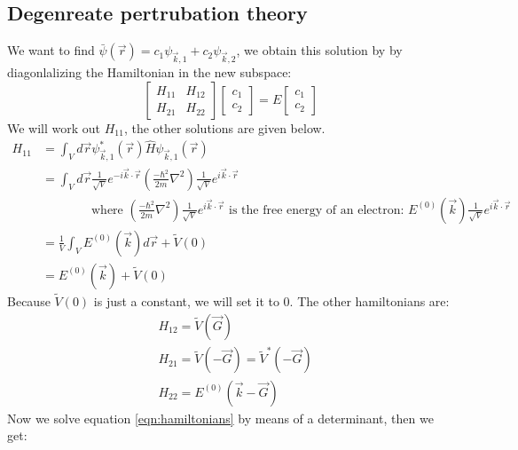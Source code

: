 \subsection{Degenreate pertrubation theory} \label{sec:dpt}
We want to find $\bar{\psi}(\vec{r}) = c_1\psi_{\vec{k}, 1} + c_2\psi_{\vec{k}, 2}$, we obtain this solution by by diagonlalizing the Hamiltonian in the new subspace:
\begin{equation}
    \left[
    \begin{array}{lr}
        H_{11} & H_{12}\\
        H_{21} & H_{22}
    \end{array}  \right]
    \left[
    \begin{array}{lr}
    c_1\\
    c_2
    \end{array}\right]
    =
    E\left[\begin{array}{lr}
    c_1\\
    c_2
    \end{array}\right] \label{eqn:hamiltonians}
\end{equation}
We will work out $H_{11}$, the other solutions are given below.
\begin{align}
    H_{11} &= \int_{V}^{}d\vec{r}\psi^*_{\vec{k}, 1}(\vec{r})\hat{H}\psi_{\vec{k}, 1}(\vec{r}) \\
    &= \int_{V}^{}d\vec{r}\frac{1}{\sqrt{V}}e^{-i\vec{k}\cdot\vec{r}}\left(\frac{-\hbar^2}{2m}\nabla^2\right)\frac{1}{\sqrt{V}}e^{i\vec{k}\cdot\vec{r}}\\
    &\qquad\qquad \text{where }\left(\frac{-\hbar^2}{2m}\nabla^2\right)\frac{1}{\sqrt{V}}e^{i\vec{k}\cdot\vec{r}} \text{ is the free energy of an electron: } E^{(0)}(\vec{k})\frac{1}{\sqrt{V}}e^{i\vec{k}\cdot\vec{r}}\nonumber\\
    &= \frac{1}{V} \int_{V}^{}E^{(0)}(\vec{k})d\vec{r} + \tilde{V}(0)\\
    &= E^{(0)}(\vec{k}) + \tilde{V}(0)
\end{align}
Because $\tilde{V}(0)$ is just a constant, we will set it to $0$. The other hamiltonians are:
\begin{align}
    & H_{12} = \tilde{V}(\vec{G}) \\
    & H_{21} = \tilde{V}(-\vec{G}) = \tilde{V}^*(-\vec{G}) \\
    & H_{22} = E^{(0)}(\vec{k} - \vec{G})
\end{align}
Now we solve equation \ref{eqn:hamiltonians} by means of a determinant, then we get:

